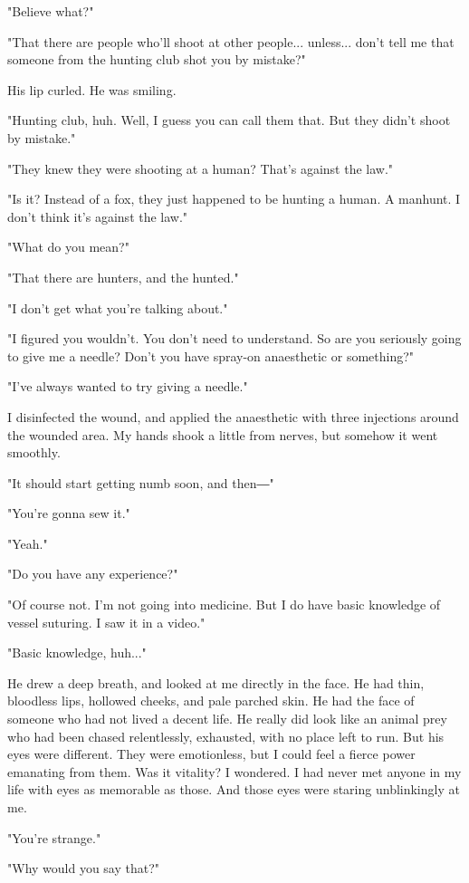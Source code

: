 "Believe what?"

"That there are people who'll shoot at other people... unless... don't
tell me that someone from the hunting club shot you by mistake?"

His lip curled. He was smiling.

"Hunting club, huh. Well, I guess you can call them that. But they
didn't shoot by mistake."

"They knew they were shooting at a human? That's against the law."

"Is it? Instead of a fox, they just happened to be hunting a human. A
manhunt. I don't think it's against the law."

"What do you mean?"

"That there are hunters, and the hunted."

"I don't get what you're talking about."

"I figured you wouldn't. You don't need to understand. So are you
seriously going to give me a needle? Don't you have spray-on anaesthetic
or something?"

"I've always wanted to try giving a needle."

I disinfected the wound, and applied the anaesthetic with three
injections around the wounded area. My hands shook a little from nerves,
but somehow it went smoothly.

"It should start getting numb soon, and then―"

"You're gonna sew it."

"Yeah."

"Do you have any experience?"

"Of course not. I'm not going into medicine. But I do have basic
knowledge of vessel suturing. I saw it in a video."

"Basic knowledge, huh..."

He drew a deep breath, and looked at me directly in the face. He had
thin, bloodless lips, hollowed cheeks, and pale parched skin. He had the
face of someone who had not lived a decent life. He really did look like
an animal prey who had been chased relentlessly, exhausted, with no
place left to run. But his eyes were different. They were emotionless,
but I could feel a fierce power emanating from them. Was it vitality? I
wondered. I had never met anyone in my life with eyes as memorable as
those. And those eyes were staring unblinkingly at me.

"You're strange."

"Why would you say that?"

